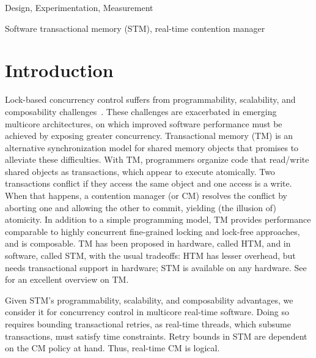 \documentclass[letter]{sig-alternate}
\begin{document}
\terms
Design, Experimentation, Measurement

\keywords
Software transactional memory (STM), real-time contention manager


\section{Introduction}

\label{sec:intro}

Lock-based concurrency control suffers from programmability, scalability, and composability challenges~\cite{Herlihy:2006:AMP:1146381.1146382}. These challenges are exacerbated in emerging multicore architectures, on which improved software performance must be achieved by exposing greater concurrency.  Transactional memory (TM) is an alternative synchronization model for shared memory objects that promises to alleviate these difficulties.  With TM, programmers organize code that read/write shared objects as transactions, which appear to execute atomically. Two transactions conflict if they access the same object and one access is a write. When that happens, a contention manager (or CM)
resolves the conflict by aborting one and allowing the other to commit, yielding (the illusion of) atomicity. 
In addition to a simple programming model, TM provides performance comparable to highly concurrent fine-grained locking and lock-free approaches,  
and is composable. 
TM has been proposed in hardware, called HTM,  
and in software, called STM,  
with the usual tradeoffs: HTM has lesser overhead, but needs transactional support in hardware; STM is available on any hardware. See~\cite{tm-book10} for an excellent overview on TM.


Given STM's programmability, scalability, and composability advantages, we consider it for concurrency control in multicore real-time software. Doing so requires bounding transactional  retries, as real-time threads, which subsume transactions, must satisfy time constraints.  Retry bounds in STM are dependent on the CM policy at hand. Thus, real-time CM is logical.
\end{document}
